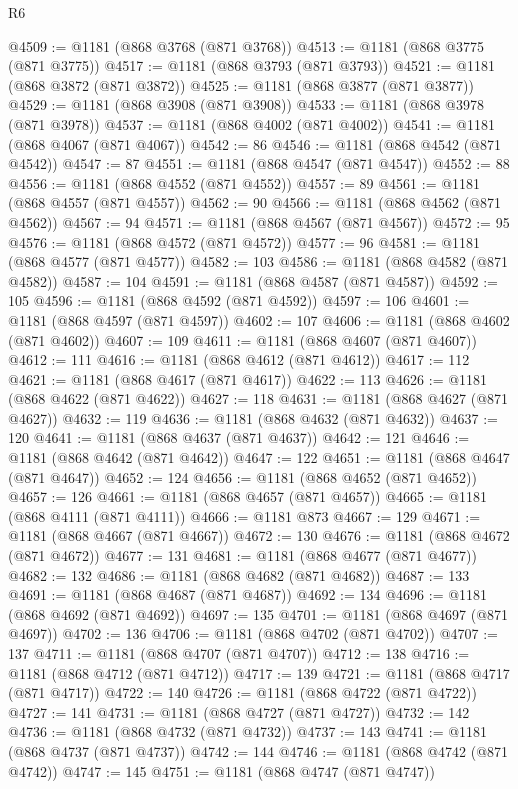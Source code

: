 \begin{lexlean}{R6}
\begin{coremodule}
@4509 := @1181 (@868 @3768 (@871 @3768))
@4513 := @1181 (@868 @3775 (@871 @3775))
@4517 := @1181 (@868 @3793 (@871 @3793))
@4521 := @1181 (@868 @3872 (@871 @3872))
@4525 := @1181 (@868 @3877 (@871 @3877))
@4529 := @1181 (@868 @3908 (@871 @3908))
@4533 := @1181 (@868 @3978 (@871 @3978))
@4537 := @1181 (@868 @4002 (@871 @4002))
@4541 := @1181 (@868 @4067 (@871 @4067))
@4542 := 86
@4546 := @1181 (@868 @4542 (@871 @4542))
@4547 := 87
@4551 := @1181 (@868 @4547 (@871 @4547))
@4552 := 88
@4556 := @1181 (@868 @4552 (@871 @4552))
@4557 := 89
@4561 := @1181 (@868 @4557 (@871 @4557))
@4562 := 90
@4566 := @1181 (@868 @4562 (@871 @4562))
@4567 := 94
@4571 := @1181 (@868 @4567 (@871 @4567))
@4572 := 95
@4576 := @1181 (@868 @4572 (@871 @4572))
@4577 := 96
@4581 := @1181 (@868 @4577 (@871 @4577))
@4582 := 103
@4586 := @1181 (@868 @4582 (@871 @4582))
@4587 := 104
@4591 := @1181 (@868 @4587 (@871 @4587))
@4592 := 105
@4596 := @1181 (@868 @4592 (@871 @4592))
@4597 := 106
@4601 := @1181 (@868 @4597 (@871 @4597))
@4602 := 107
@4606 := @1181 (@868 @4602 (@871 @4602))
@4607 := 109
@4611 := @1181 (@868 @4607 (@871 @4607))
@4612 := 111
@4616 := @1181 (@868 @4612 (@871 @4612))
@4617 := 112
@4621 := @1181 (@868 @4617 (@871 @4617))
@4622 := 113
@4626 := @1181 (@868 @4622 (@871 @4622))
@4627 := 118
@4631 := @1181 (@868 @4627 (@871 @4627))
@4632 := 119
@4636 := @1181 (@868 @4632 (@871 @4632))
@4637 := 120
@4641 := @1181 (@868 @4637 (@871 @4637))
@4642 := 121
@4646 := @1181 (@868 @4642 (@871 @4642))
@4647 := 122
@4651 := @1181 (@868 @4647 (@871 @4647))
@4652 := 124
@4656 := @1181 (@868 @4652 (@871 @4652))
@4657 := 126
@4661 := @1181 (@868 @4657 (@871 @4657))
@4665 := @1181 (@868 @4111 (@871 @4111))
@4666 := @1181 @873
@4667 := 129
@4671 := @1181 (@868 @4667 (@871 @4667))
@4672 := 130
@4676 := @1181 (@868 @4672 (@871 @4672))
@4677 := 131
@4681 := @1181 (@868 @4677 (@871 @4677))
@4682 := 132
@4686 := @1181 (@868 @4682 (@871 @4682))
@4687 := 133
@4691 := @1181 (@868 @4687 (@871 @4687))
@4692 := 134
@4696 := @1181 (@868 @4692 (@871 @4692))
@4697 := 135
@4701 := @1181 (@868 @4697 (@871 @4697))
@4702 := 136
@4706 := @1181 (@868 @4702 (@871 @4702))
@4707 := 137
@4711 := @1181 (@868 @4707 (@871 @4707))
@4712 := 138
@4716 := @1181 (@868 @4712 (@871 @4712))
@4717 := 139
@4721 := @1181 (@868 @4717 (@871 @4717))
@4722 := 140
@4726 := @1181 (@868 @4722 (@871 @4722))
@4727 := 141
@4731 := @1181 (@868 @4727 (@871 @4727))
@4732 := 142
@4736 := @1181 (@868 @4732 (@871 @4732))
@4737 := 143
@4741 := @1181 (@868 @4737 (@871 @4737))
@4742 := 144
@4746 := @1181 (@868 @4742 (@871 @4742))
@4747 := 145
@4751 := @1181 (@868 @4747 (@871 @4747))

\end{coremodule}
\end{lexlean}
